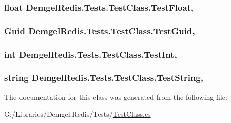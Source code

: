 \subsubsection[{Test\+Float}]{\setlength{\rightskip}{0pt plus 5cm}float Demgel\+Redis.\+Tests.\+Test\+Class.\+Test\+Float\hspace{0.3cm}{\ttfamily [get]}, {\ttfamily [set]}}\label{class_demgel_redis_1_1_tests_1_1_test_class_aed7bb016ef514b9adb5342d883fc01f1}
\hypertarget{class_demgel_redis_1_1_tests_1_1_test_class_a6d17a9b2258f9b97674102d4c0e50fe2}{}
\subsubsection[{Test\+Guid}]{\setlength{\rightskip}{0pt plus 5cm}Guid Demgel\+Redis.\+Tests.\+Test\+Class.\+Test\+Guid\hspace{0.3cm}{\ttfamily [get]}, {\ttfamily [set]}}\label{class_demgel_redis_1_1_tests_1_1_test_class_a6d17a9b2258f9b97674102d4c0e50fe2}
\hypertarget{class_demgel_redis_1_1_tests_1_1_test_class_ad1bcc60fe93e92012a8e76c47321dfdb}{}
\subsubsection[{Test\+Int}]{\setlength{\rightskip}{0pt plus 5cm}int Demgel\+Redis.\+Tests.\+Test\+Class.\+Test\+Int\hspace{0.3cm}{\ttfamily [get]}, {\ttfamily [set]}}\label{class_demgel_redis_1_1_tests_1_1_test_class_ad1bcc60fe93e92012a8e76c47321dfdb}
\hypertarget{class_demgel_redis_1_1_tests_1_1_test_class_a0f441625155e68f40b8cfec35b24890e}{}
\subsubsection[{Test\+String}]{\setlength{\rightskip}{0pt plus 5cm}string Demgel\+Redis.\+Tests.\+Test\+Class.\+Test\+String\hspace{0.3cm}{\ttfamily [get]}, {\ttfamily [set]}}\label{class_demgel_redis_1_1_tests_1_1_test_class_a0f441625155e68f40b8cfec35b24890e}


The documentation for this class was generated from the following file\+:\begin{DoxyCompactItemize}
\item 
G\+:/\+Libraries/\+Demgel.\+Redis/\+Tests/\hyperlink{_test_class_8cs}{Test\+Class.\+cs}\end{DoxyCompactItemize}
